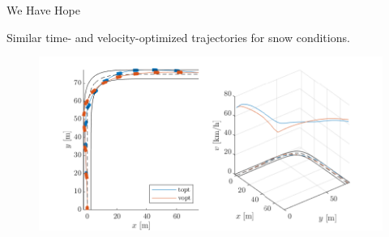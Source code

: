 \begin{frame}{We Have Hope}
    \subtitle{"Rebellions Are Built On Hope!"}
    Similar time- and velocity-optimized trajectories for snow conditions.

    \begin{figure}
        \centering
        \includegraphics[height=0.7\textheight]{figures/pep2_iceice.pdf}
    \end{figure}


\end{frame}